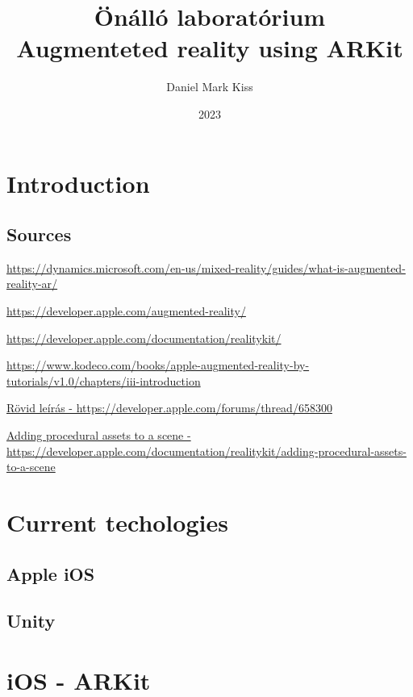 \documentclass{report}
\title{\Huge{Önálló laboratórium}\\Augmenteted reality using ARKit}
\author{\huge{Daniel Mark Kiss}}
\date{2023}
\begin{document}
\maketitle
\newpage
\tableofcontents
\pagebreak

\chapter{Introduction}
\section{Sources}

\hyperlink{https://dynamics.microsoft.com/en-us/mixed-reality/guides/what-is-augmented-reality-ar/}{https://dynamics.microsoft.com/en-us/mixed-reality/guides/what-is-augmented-reality-ar/}

\hyperlink{https://developer.apple.com/augmented-reality/}{https://developer.apple.com/augmented-reality/}

\hyperlink{https://developer.apple.com/documentation/realitykit/}{https://developer.apple.com/documentation/realitykit/}

\hyperlink{https://www.kodeco.com/books/apple-augmented-reality-by-tutorials/v1.0/chapters/iii-introduction}{https://www.kodeco.com/books/apple-augmented-reality-by-tutorials/v1.0/chapters/iii-introduction}

\hyperlink{https://developer.apple.com/forums/thread/658300}{Rövid leírás - https://developer.apple.com/forums/thread/658300}

\hyperlink{https://developer.apple.com/documentation/realitykit/adding-procedural-assets-to-a-scene}{Adding procedural assets to a scene - https://developer.apple.com/documentation/realitykit/adding-procedural-assets-to-a-scene}
\chapter{Current techologies}

\section{Apple iOS}

\section{Unity}

\chapter{iOS - ARKit}
\end{document}
